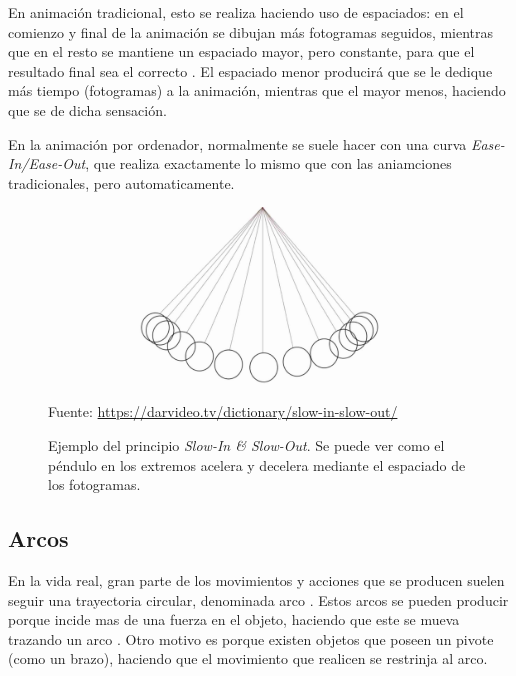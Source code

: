 \documentclass{article}
\begin{document}
\bigskip

En animación tradicional, esto se realiza haciendo uso de espaciados: en el comienzo y final de la animación se dibujan más fotogramas seguidos, mientras que en el resto se mantiene un espaciado mayor, pero constante, para que el resultado final sea el correcto \cite{plural}. El espaciado menor producirá que se le dedique más tiempo (fotogramas) a la animación, mientras que el mayor menos, haciendo que se de dicha sensación.

\bigskip

En la animación por ordenador, normalmente se suele hacer con una curva \textit{Ease-In/Ease-Out}, que realiza exactamente lo mismo que con las aniamciones tradicionales, pero automaticamente.

\begin{figure}[H]
    \centering
    \includegraphics[width=\textwidth]{imagenes/Slow-In-and-Slow-Out.jpg}
    \caption{Ejemplo del principio \textit{Slow-In \& Slow-Out}. Se puede ver como el péndulo en los extremos acelera y decelera mediante el espaciado de los fotogramas.}
    \vspace{10pt}
    \footnotesize{Fuente: \url{https://darvideo.tv/dictionary/slow-in-slow-out/}}
\end{figure}

\subsection{Arcos}

En la vida real, gran parte de los movimientos y acciones que se producen suelen seguir una trayectoria circular, denominada arco \cite{arcsdsource}. Estos arcos se pueden producir porque incide mas de una fuerza en el objeto, haciendo que este se mueva trazando un arco \cite{arcslinkedin}. Otro motivo es porque existen objetos que poseen un pivote (como un brazo), haciendo que el movimiento que realicen se restrinja al arco.

\bigskip
\end{document}
